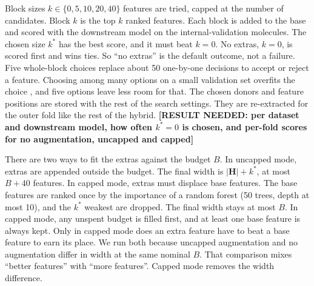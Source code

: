 Block sizes $k \in \{0, 5, 10, 20, 40\}$ features are tried, capped at the number of candidates. Block $k$ is the top $k$ ranked features. Each block is added to the base and scored with the downstream model on the internal-validation molecules. The chosen size $k^*$ has the best score, and it must beat $k=0$. No extras, $k=0$, is scored first and wins ties. So ``no extras'' is the default outcome, not a failure. Five whole-block choices replace about 50 one-by-one decisions to accept or reject a feature. Choosing among many options on a small validation set overfits the choice \citep{Cawley2010}, and five options leave less room for that. The chosen donors and feature positions are stored with the rest of the search settings. They are re-extracted for the outer fold like the rest of the hybrid. \textbf{[RESULT NEEDED: per dataset and downstream model, how often $k^*=0$ is chosen, and per-fold scores for no augmentation, uncapped and capped]}

There are two ways to fit the extras against the budget $B$. In uncapped mode, extras are appended outside the budget. The final width is $|\mathbf{H}| + k^*$, at most $B + 40$ features. In capped mode, extras must displace base features. The base features are ranked once by the importance of a random forest (50 trees, depth at most 10), and the $k^*$ weakest are dropped. The final width stays at most $B$. In capped mode, any unspent budget is filled first, and at least one base feature is always kept. Only in capped mode does an extra feature have to beat a base feature to earn its place. We run both because uncapped augmentation and no augmentation differ in width at the same nominal $B$. That comparison mixes ``better features'' with ``more features''. Capped mode removes the width difference.

